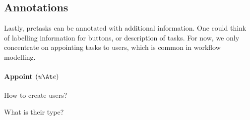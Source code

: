 \subsection{Annotations}

Lastly, pretasks can be annotated with additional information.
One could think of labelling information for buttons,
or description of tasks.
For now, we only concentrate on appointing tasks to users,
which is common in workflow modelling.



\paragraph{Appoint $(u \At e)$}

\begin{itemize*}
  \item How to create users?
  \item What is their type?
\end{itemize*}
